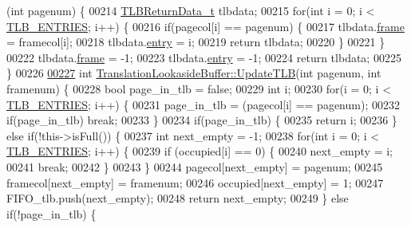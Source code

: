 \begin{DoxyCode}
{{{{{{{{{{{{{{{{{      (\textcolor{keywordtype}{int} pagenum) \{
00214     \hyperlink{structTLBReturnData__t}{TLBReturnData\_t} tlbdata;
00215     \textcolor{keywordflow}{for}(\textcolor{keywordtype}{int} i = 0; i < \hyperlink{memory_8h_a49009cc208379999b117ed68da61c759}{TLB\_ENTRIES}; i++) \{
00216         \textcolor{keywordflow}{if}(pagecol[i] == pagenum) \{
00217             tlbdata.\hyperlink{structTLBReturnData__t_ac4bdfa0ee74b50048e94321426877439}{frame} = framecol[i];
00218             tlbdata.\hyperlink{structTLBReturnData__t_a58914c8a985e6cdb2f48a56ab41a6985}{entry} = i;
00219             \textcolor{keywordflow}{return} tlbdata;
00220         \}
00221     \}
00222     tlbdata.\hyperlink{structTLBReturnData__t_ac4bdfa0ee74b50048e94321426877439}{frame} = -1;
00223     tlbdata.\hyperlink{structTLBReturnData__t_a58914c8a985e6cdb2f48a56ab41a6985}{entry} = -1;
00224     \textcolor{keywordflow}{return} tlbdata;
00225 \}
00226 
\hypertarget{memory_8cpp_source.tex_l00227}{}\hyperlink{classTranslationLookasideBuffer_a68fe2b0deb2abb9854764471d7c2cba3}{00227} \textcolor{keywordtype}{int} \hyperlink{classTranslationLookasideBuffer_a68fe2b0deb2abb9854764471d7c2cba3}{TranslationLookasideBuffer::UpdateTLB}(\textcolor{keywordtype}{int} pagenum, \textcolor{keywordtype}{int} framenum) \{
00228     \textcolor{keywordtype}{bool} page\_in\_tlb = \textcolor{keyword}{false};
00229     \textcolor{keywordtype}{int} i;
00230     \textcolor{keywordflow}{for}(i = 0; i < \hyperlink{memory_8h_a49009cc208379999b117ed68da61c759}{TLB\_ENTRIES}; i++) \{
00231         page\_in\_tlb = (pagecol[i] == pagenum);
00232         \textcolor{keywordflow}{if}(page\_in\_tlb) \textcolor{keywordflow}{break};
00233     \}
00234     \textcolor{keywordflow}{if}(page\_in\_tlb) \{
00235         \textcolor{keywordflow}{return} i;
00236     \} \textcolor{keywordflow}{else} \textcolor{keywordflow}{if}(!this->isFull()) \{
00237         \textcolor{keywordtype}{int} next\_empty = -1;
00238         \textcolor{keywordflow}{for}(\textcolor{keywordtype}{int} i = 0; i < \hyperlink{memory_8h_a49009cc208379999b117ed68da61c759}{TLB\_ENTRIES}; i++) \{
00239             \textcolor{keywordflow}{if} (occupied[i] == 0) \{
00240                 next\_empty = i;
00241                 \textcolor{keywordflow}{break};
00242             \}
00243         \}
00244         pagecol[next\_empty] = pagenum;
00245         framecol[next\_empty] = framenum;
00246         occupied[next\_empty] = 1;
00247         FIFO\_tlb.push(next\_empty);
00248         \textcolor{keywordflow}{return} next\_empty;
00249     \} \textcolor{keywordflow}{else} \textcolor{keywordflow}{if}(!page\_in\_tlb) \{
}}}}}}}}}}}}}}}}}
\end{DoxyCode}
